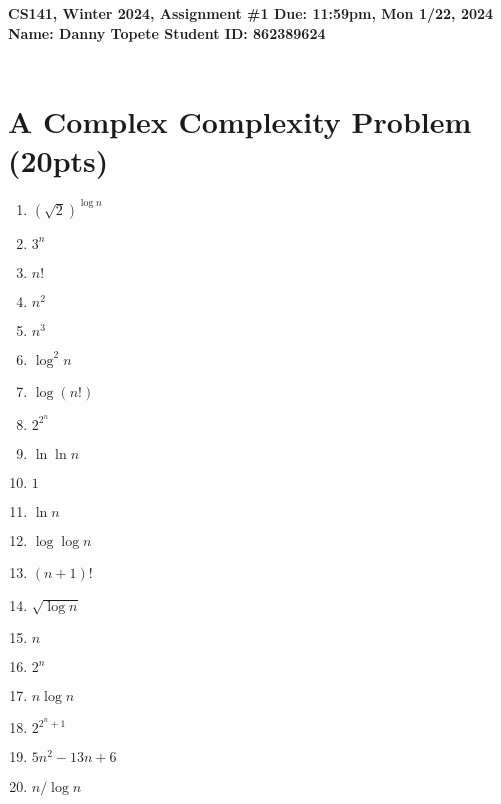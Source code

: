 \documentclass{article}[12pt]
\newcommand\encircle[1]{\raisebox{.5pt}{\textcircled{\raisebox{-.9pt} {\footnotesize #1}}} }
\newcommand{\deadline}{11:59pm, Mon 1/22, 2024}
\newcommand{\assigntitle}[1]{{
  \noindent \large \bf
  CS141, Winter 2024,
  Assignment \##1 \hfill Due: {\deadline}\\
  Name: Danny Topete %
  \hspace{2.5in}
  Student ID: 862389624 %
  \\
  [-.05in]
  \mbox{}\hrulefill \mbox{}\\}}
\begin{document}
\assigntitle{1}{}
\date{}

\section{A Complex Complexity Problem (20pts)}

\begin{center}
\begin{multicols}{4}
\begin{enumerate}[label=\encircle{\arabic*}]
  \item $(\sqrt{2})^{\log n}$
  \item $3^n$
  \item $n!$
  \item $n^2$
  \item $n^3$
  \item $\log^2n$
  \item $\log(n!)$
  \item $2^{2^n}$
  \item $\ln\ln n$
  \item $1$
  \item $\ln n$
  \item $\log \log n$
  \item $(n+1)!$
  \item $\sqrt{\log n}$
  \item $n$
  \item $2^n$
  \item $n\log n$
  \item $2^{2^n+1}$
  \item $5n^2-13n+6$
  \item $n/\log n$
\end{enumerate}
\end{multicols}
\end{center}
\end{document}
